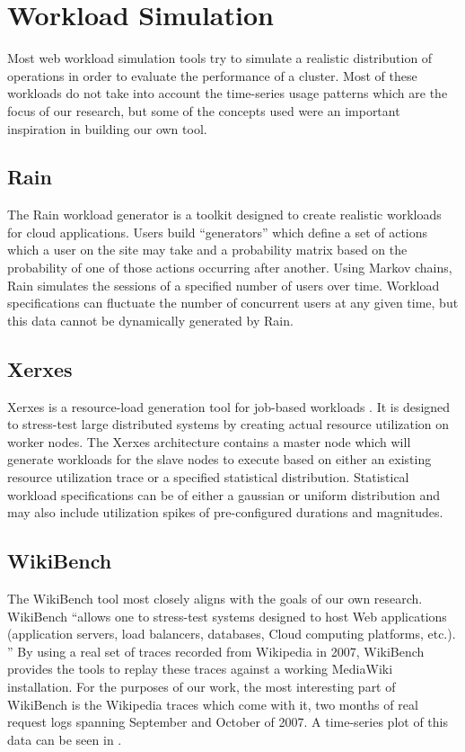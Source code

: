 \section{Workload Simulation}
Most web workload simulation tools try to simulate a realistic distribution of operations in order to evaluate the performance of a cluster. Most of these workloads do not take into account the time-series usage patterns which are the focus of our research, but some of the concepts used were an important inspiration in building our own tool.

\subsection{Rain}
The Rain \cite{beitch2010rain} workload generator is a toolkit designed to create realistic workloads for cloud applications. Users build ``generators'' which define a set of actions which a user on the site may take and a probability matrix based on the probability of one of those actions occurring after another. Using Markov chains, Rain simulates the sessions of a specified number of users over time. Workload specifications can fluctuate the number of concurrent users at any given time, but this data cannot be dynamically generated by Rain.

\subsection{Xerxes}
Xerxes is a resource-load generation tool for job-based workloads \cite{kesavan2012xerxes}. It is designed to stress-test large distributed systems by creating actual resource utilization on worker nodes. The Xerxes architecture contains a master node which will generate workloads for the slave nodes to execute based on either an existing resource utilization trace or a specified statistical distribution. Statistical workload specifications can be of either a gaussian or uniform distribution and may also include utilization spikes of pre-configured durations and magnitudes.

\subsection{WikiBench}
The WikiBench tool most closely aligns with the goals of our own research. WikiBench ``allows one to stress-test systems designed to host Web applications (application servers, load balancers, databases, Cloud computing platforms, etc.). \cite{wikibench}'' By using a real set of traces recorded from Wikipedia in 2007, WikiBench provides the tools to replay these traces against a working MediaWiki installation. For the purposes of our work, the most interesting part of WikiBench is the Wikipedia traces which come with it, two months of real request logs spanning September and October of 2007. A time-series plot of this data can be seen in .

